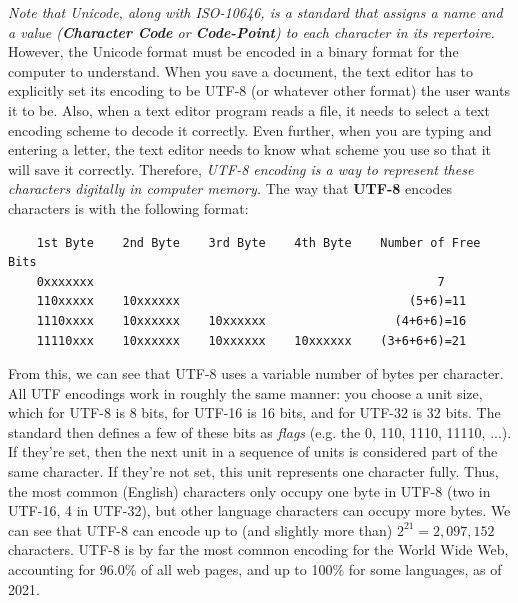     \textit{Note that Unicode, along with ISO-10646, is a standard that assigns a name and a value (\textbf{Character Code} or \textbf{Code-Point}) to each character in its repertoire.} However, the Unicode format must be encoded in a binary format for the computer to understand. When you save a document, the text editor has to explicitly set its encoding to be UTF-8 (or whatever other format) the user wants it to be. Also, when a text editor program reads a file, it needs to select a text encoding scheme to decode it correctly. Even further, when you are typing and entering a letter, the text editor needs to know what scheme you use so that it will save it correctly. Therefore, \textit{UTF-8 encoding is a way to represent these characters digitally in computer memory.} The way that \textbf{UTF-8} encodes characters is with the following format:
    \begin{lstlisting}
    1st Byte    2nd Byte    3rd Byte    4th Byte    Number of Free Bits   
    0xxxxxxx                                                7             
    110xxxxx    10xxxxxx                                (5+6)=11          
    1110xxxx    10xxxxxx    10xxxxxx                  (4+6+6)=16         
    11110xxx    10xxxxxx    10xxxxxx    10xxxxxx    (3+6+6+6)=21         
    \end{lstlisting}
    From this, we can see that UTF-8 uses a variable number of bytes per character. All UTF encodings work in roughly the same manner: you choose a unit size, which for UTF-8 is 8 bits, for UTF-16 is 16 bits, and for UTF-32 is 32 bits. The standard then defines a few of these bits as \textit{flags} (e.g. the 0, 110, 1110, 11110, ...). If they're set, then the next unit in a sequence of units is considered part of the same character. If they're not set, this unit represents one character fully. Thus, the most common (English) characters only occupy one byte in UTF-8 (two in UTF-16, 4 in UTF-32), but other language characters can occupy more bytes. We can see that UTF-8 can encode up to (and slightly more than) $2^{21} = 2,097,152$ characters. UTF-8 is by far the most common encoding for the World Wide Web, accounting for 96.0\% of all web pages, and up to 100\% for some languages, as of 2021.

